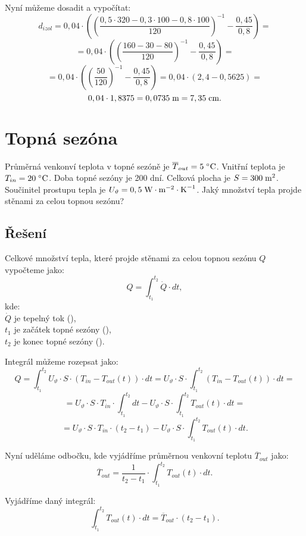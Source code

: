 \documentclass{article}
\begin{document}
Nyní můžeme dosadit a vypočítat:
$$
    d_{izol} = 0,04 \cdot \left( \left( \frac{0,5 \cdot 320 - 0,3 \cdot 100 - 0,8 \cdot 100}{120} \right)^{-1} - \frac{0,45}{0,8} \right) =
$$
$$
    = 0,04 \cdot \left( \left( \frac{160 - 30 - 80}{120} \right)^{-1} - \frac{0,45}{0,8} \right) =
$$
$$
    = 0,04 \cdot \left( \left( \frac{50}{120} \right)^{-1} - \frac{0,45}{0,8} \right) = 0,04 \cdot (2,4 - 0,5625) =
$$
$$
    0,04 \cdot 1,8375 = 0,0735 \; \textrm{m} = 7,35 \; \textrm{cm}.
$$

\newpage



\section{ Topná sezóna \spicy \spicy \spicy}
Průměrná venkonví teplota v topné sezóně je $\overline{T}_{out} = 5 \; ^\circ \textrm{C}$. Vnitřní teplota je $T_{in} = 20 \; ^\circ \textrm{C}$. Doba topné sezóny je 200 dní. Celková plocha je $S = 300 \; \textrm{m}^{\textrm{2}}$. Součinitel prostupu tepla je $U_\vartheta = 0,5 \; \textrm{W} \cdot \textrm{m}^{-2} \cdot \textrm{K}^{-1}$. Jaký množství tepla projde stěnami za celou topnou sezónu?

\subsection{Řešení}
Celkové množství tepla, které projde stěnami za celou topnou sezónu $Q$ vypočteme jako:
$$
    Q = \int_{t_1}^{t_2} \dot{Q} \cdot dt,
$$
kde:\\
$\dot{Q}$ je tepelný tok (\ueqW),\\
$t_1$ je začátek topné sezóny (\uH),\\
$t_2$ je konec topné sezóny (\uH).

Integrál můžeme rozepsat jako:
$$
    Q = \int_{t_1}^{t_2} U_\vartheta \cdot S \cdot (T_{in} - T_{out} (t)) \cdot dt = U_\vartheta \cdot S \cdot \int_{t_1}^{t_2} (T_{in} - T_{out} (t)) \cdot dt =
$$
$$
    = U_\vartheta \cdot S \cdot T_{in} \cdot \int_{t_1}^{t_2} dt - U_\vartheta \cdot S \cdot \int_{t_1}^{t_2} T_{out} (t) \cdot dt =
$$
$$
    = U_\vartheta \cdot S \cdot T_{in} \cdot (t_2 - t_1) - U_\vartheta \cdot S \cdot \int_{t_1}^{t_2} T_{out} (t) \cdot dt.
$$

Nyní uděláme odbočku, kde vyjádříme průměrnou venkovní teplotu $\overline{T}_{out}$ jako:
$$
    \overline{T}_{out} = \frac{1}{t_2 - t_1} \cdot \int_{t_1}^{t_2} T_{out} (t) \cdot dt.
$$

Vyjádříme daný integrál:
$$
    \int_{t_1}^{t_2} T_{out} (t) \cdot dt = \overline{T}_{out} \cdot (t_2 - t_1).
$$
\end{document}
